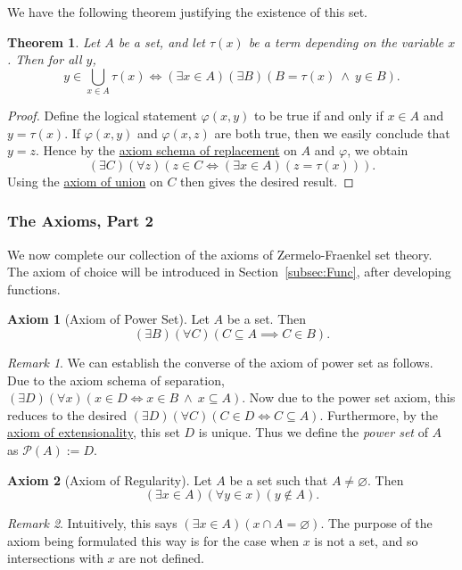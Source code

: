 \documentclass[a4paper,11pt]{article}
\theoremstyle{plain}
\newtheorem{thm}{Theorem}[subsection]
\theoremstyle{definition}
\newtheorem{axiom}{Axiom}
\theoremstyle{remark}
\newtheorem*{rem}{Remark}
\begin{document}
We have the following theorem justifying the existence of this set.
\begin{thm}
Let $A$ be a set, and let $\tau(x)$ be a term depending on the variable $x$. Then for all $y$,
\[y\in\bigcup_{x\in A}\tau(x) \iff (\exists x\in A)(\exists B)(B = \tau(x) \ \land \ y \in B).\]
\end{thm}
\begin{proof}
Define the logical statement $\varphi(x,y)$ to be true if and only if $x\in A$ and $y = \tau(x)$. If $\varphi(x,y)$ and $\varphi(x,z)$ are both true, then we easily conclude that $y = z$. Hence by the \hyperref[axiom:replacement]{axiom schema of replacement} on $A$ and $\varphi$, we obtain
\[(\exists C)(\forall z)(z \in C \iff (\exists x\in A)(z = \tau(x))).\]
Using the \hyperref[axiom:union]{axiom of union} on $C$ then gives the desired result.
\end{proof}


\subsubsection{The Axioms, Part 2}
\label{subsubsec:AxiomsPart2}
We now complete our collection of the axioms of Zermelo-Fraenkel set theory. The axiom of choice will be introduced in Section~\ref{subsec:Func}, after developing functions.

\begin{axiom}[Axiom of Power Set]
\label{axiom:power}
Let $A$ be a set. Then
\[(\exists B)(\forall C)(C \subseteq A \implies C \in B).\]
\end{axiom}
\begin{rem}
We can establish the converse of the axiom of power set as follows. Due to the axiom schema of separation, $(\exists D)(\forall x)(x \in D \iff x \in B \ \land \ x \subseteq A)$. Now due to the power set axiom, this reduces to the desired $(\exists D)(\forall C)(C \in D \iff C \subseteq A)$. Furthermore, by the \hyperref[axiom:extensionality]{axiom of extensionality}, this set $D$ is unique. Thus we define the \textit{power set} of $A$ as $\mathscr{P}(A) := D$.
\end{rem}

\begin{axiom}[Axiom of Regularity]
\label{axiom:regularity}
Let $A$ be a set such that $A \neq \varnothing$. Then
\[(\exists x\in A)(\forall y\in x)(y \notin A).\]
\end{axiom}
\begin{rem}
Intuitively, this says $(\exists x \in A)(x \cap A = \varnothing)$. The purpose of the axiom being formulated this way is for the case when $x$ is not a set, and so intersections with $x$ are not defined.
\end{rem}
\end{document}
